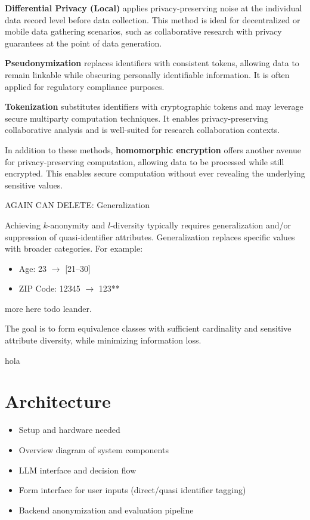 \documentclass{article}
\begin{document}
\textbf{Differential Privacy (Local)} applies privacy-preserving noise at the individual data record level before data collection. This method is ideal for decentralized or mobile data gathering scenarios, such as collaborative research with privacy guarantees at the point of data generation.

\textbf{Pseudonymization} replaces identifiers with consistent tokens, allowing data to remain linkable while obscuring personally identifiable information. It is often applied for regulatory compliance purposes.

\textbf{Tokenization} substitutes identifiers with cryptographic tokens and may leverage secure multiparty computation techniques. It enables privacy-preserving collaborative analysis and is well-suited for research collaboration contexts.

In addition to these methods, \textbf{homomorphic encryption} offers another avenue for privacy-preserving computation, allowing data to be processed while still encrypted. This enables secure computation without ever revealing the underlying sensitive values.

AGAIN CAN DELETE: Generalization

Achieving $k$-anonymity and $l$-diversity typically requires generalization and/or suppression of quasi-identifier attributes. Generalization replaces specific values with broader categories. For example:
\begin{itemize}
\item Age: 23 $\rightarrow$ [21--30]
\item ZIP Code: 12345 $\rightarrow$ 123**
\end{itemize}
more here todo leander. 


The goal is to form equivalence classes with sufficient cardinality and sensitive attribute diversity, while minimizing information loss.



hola

\section{Architecture}
\begin{itemize}
    \item Setup and hardware needed
    \item Overview diagram of system components
    \item LLM interface and decision flow
    \item Form interface for user inputs (direct/quasi identifier tagging)
    \item Backend anonymization and evaluation pipeline
\end{itemize}
\end{document}
